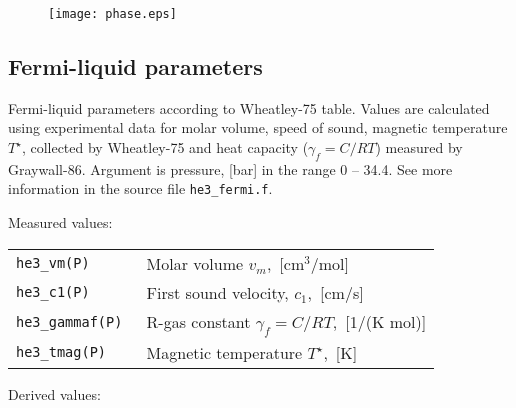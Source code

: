 \documentclass[a4paper]{article}
\begin{document}
\begin{figure}[h]
\texttt{[image: phase.eps]}
\end{figure}

{\small}

\eject
\subsection*{Fermi-liquid parameters}

Fermi-liquid parameters according to {Wheatley-75} table. Values are
calculated using experimental data for molar volume, speed of sound,
magnetic temperature $T^\star$, collected by {Wheatley-75} and heat
capacity ($\gamma_f=C/RT$) measured by {Graywall-86}. Argument is
pressure, [bar] in the range 0 -- 34.4. See more information in the
source file {\tt he3\_fermi.f}.

Measured values:

\medskip
\begin{tabular}{lp{9cm}}
\tt he3\_vm(P)     & Molar volume $v_m$,~[cm$^3$/mol]\\
\tt he3\_c1(P)     & First sound velocity, $c_1$,~[cm/s]\\
\tt he3\_gammaf(P) & R-gas constant $\gamma_f = C/RT$,~[1/(K mol)]\\
\tt he3\_tmag(P)   & Magnetic temperature $T^\star$,~[K]\newline\\
\end{tabular}
\medskip

Derived values:
\end{document}
